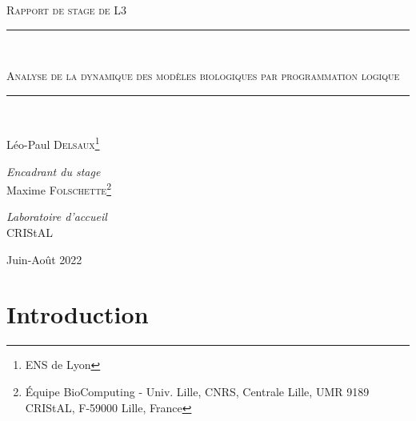 \documentclass[10pt,a4paper]{article}
\newcommand{\HRule}{\rule{\linewidth}{0.5mm}}
\begin{document}
\begin{titlepage}
    \begin{center}
        \textsc{\Large Rapport de stage de L3}\\

    \vspace{2.5cm}

        \HRule\\
        {\huge\scshape Analyse de la dynamique des modèles biologiques par programmation logique\par}
        \HRule\\

    \vspace{3cm}

        \large
        Léo-Paul \textsc{Delsaux}\footnote[2]{ENS de Lyon}\\

    \vspace{1cm}

        \large
        \emph{Encadrant du stage} \\
        Maxime \textsc{Folschette}\footnote[3]{Équipe BioComputing - Univ. Lille, CNRS, Centrale Lille, UMR 9189 CRIStAL, F-59000 Lille, France}\\

   \vspace{1cm}
   
      \large
      \emph{Laboratoire d'accueil}\\
      CRIStAL\\

    \vfill

        {\large Juin-Août 2022}
    \end{center}
\end{titlepage}


\pagestyle{plain}%

\newpage
\tableofcontents

\newpage
\section{Introduction}
\end{document}
